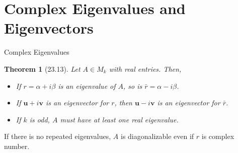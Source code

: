 \documentclass[final]{beamer}
\newtheorem{thm}{Theorem}
\newcommand{\bd}{\mathbf}
\begin{document}
\section{Complex Eigenvalues and Eigenvectors} %
\label{sec:complex_eigenvalues_and_eigenvectors}
\begin{frame}[t]{Complex Eigenvalues}
	\begin{thm}
		[23.13] Let $A\in M_k$ with real entries. Then,
		\begin{itemize}
			\item If $r=\alpha+i\beta$ is an eigenvalue of $A$, so is $\bar r = \alpha - i\beta$. 
			\item If $\bd{u}+i\bd{v}$ is an eigenvector for $r$, then $\bd{u}-i\bd{v}$ is an eigenvector for $\bar r$. 
			\item If $k$ is odd, $A$ must have at least one real eigenvalue.
		\end{itemize}
	\end{thm}
	If there is no repeated eigenvalues, $A$ is diagonalizable even if $r$ is complex number.
\end{frame}
\end{document}

